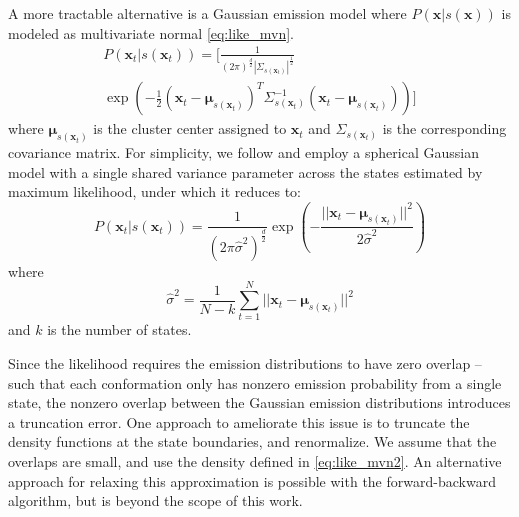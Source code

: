 \documentclass[journal=jpcbfk, layout=twocolumn, manuscript=article]{achemso}
\begin{document}
A more tractable alternative is a Gaussian emission model where $P(\mathbf{x} | s(\mathbf{x}))$ is modeled as multivariate normal \cref{eq:like_mvn}.
\begin{equation}
\label{eq:like_mvn}
\begin{split}
P(\mathbf{x}_t | s(\mathbf{x}_t)) = \Bigg[ \frac{1}{(2 \pi)^\frac{d}{2} |\Sigma_{s(\mathbf{x}_t)}|^\frac{1}{2}} \\
   \exp\left(-\frac{1}{2} (\mathbf{x}_t - \bm{\mu}_{s(\mathbf{x}_t)})^T \Sigma_{s(\mathbf{x}_t)}^{-1} (\mathbf{x}_t - \bm{\mu}_{s(\mathbf{x}_t)})\right)\Bigg] 
\end{split}
\end{equation} where $\bm{\mu}_{s(\mathbf{x}_t)}$ is the cluster center assigned to $\mathbf{x}_t$ and $\Sigma_{s(\mathbf{x}_t)}$ is the corresponding covariance matrix. For simplicity, we follow \citet{Pelleg2000Xmeans} and employ a spherical Gaussian model with a single shared variance parameter across the states estimated by maximum likelihood, under which it reduces to:
\begin{equation}
\label{eq:like_mvn2}
 P(\mathbf{x}_t | s(\mathbf{x}_t)) = \frac{1}{\left(2 \pi \hat{\sigma}^2\right)^{\frac{d}{2}}} \exp\left(-\frac{||\mathbf{x}_t - \bm{\mu}_{s(\mathbf{x}_t)}||^2}{2 \hat{\sigma}^2} \right)
\end{equation} where
\begin{equation}
\label{eq:mle_sigma}
\hat{\sigma}^2 = \frac{1}{N - k} \sum_{t=1}^N || \mathbf{x}_t - \bm{\mu}_{s(\mathbf{x}_t)} ||^2
\end{equation} and $k$ is the number of states.

Since the likelihood requires the emission distributions to have zero overlap -- such that each conformation only has nonzero emission probability from a single state, the nonzero overlap between the Gaussian emission distributions introduces a truncation error. One approach to ameliorate this issue is to truncate the density functions at the state boundaries, and renormalize. We assume that the overlaps are small, and use the density defined in \cref{eq:like_mvn2}. An alternative approach for relaxing this approximation is possible with the forward-backward algorithm,\cite{Rabiner1989Tutorial} but is beyond the scope of this work.
\end{document}
